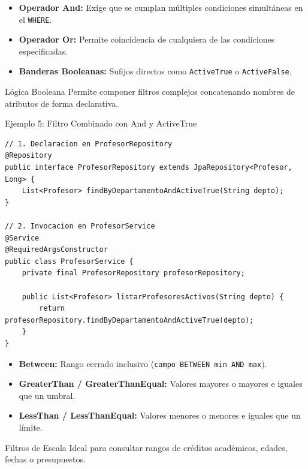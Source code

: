 \documentclass[aspectratio=169]{beamer}
\begin{document}
  {
    \begin{itemize}
      \item \textbf{Operador And:} Exige que se cumplan m\'ultiples condiciones simult\'aneas en el \texttt{WHERE}.
      \item \textbf{Operador Or:} Permite coincidencia de cualquiera de las condiciones especificadas.
      \item \textbf{Banderas Booleanas:} Sufijos directos como \texttt{ActiveTrue} o \texttt{ActiveFalse}.
    \end{itemize}
  }
  {L\'ogica Booleana}
  {Permite componer filtros complejos concatenando nombres de atributos de forma declarativa.}

\begin{frame}[fragile]{Ejemplo 5: Filtro Combinado con And y ActiveTrue}
\begin{lstlisting}[style=SpringCodeStyle]
// 1. Declaracion en ProfesorRepository
@Repository
public interface ProfesorRepository extends JpaRepository<Profesor, Long> {
    List<Profesor> findByDepartamentoAndActiveTrue(String depto);
}

// 2. Invocacion en ProfesorService
@Service
@RequiredArgsConstructor
public class ProfesorService {
    private final ProfesorRepository profesorRepository;

    public List<Profesor> listarProfesoresActivos(String depto) {
        return profesorRepository.findByDepartamentoAndActiveTrue(depto);
    }
}
\end{lstlisting}
\end{frame}

  {
    \begin{itemize}
      \item \textbf{Between:} Rango cerrado inclusivo (\texttt{campo BETWEEN min AND max}).
      \item \textbf{GreaterThan / GreaterThanEqual:} Valores mayores o mayores e iguales que un umbral.
      \item \textbf{LessThan / LessThanEqual:} Valores menores o menores e iguales que un l\'imite.
    \end{itemize}
  }
  {Filtros de Escala}
  {Ideal para consultar rangos de cr\'editos acad\'emicos, edades, fechas o presupuestos.}
\end{document}
